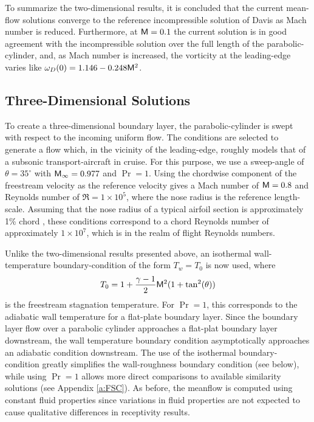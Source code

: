 To summarize the two-dimensional results, it is concluded that the current
mean-flow solutions converge to the reference incompressible solution of Davis
as Mach number is reduced.  Furthermore, at ${\sf M}=0.1$ the current solution is
in good agreement with the incompressible solution over the full length of the
parabolic-cylinder, and, as Mach number is increased, the vorticity at the
leading-edge varies like $\omega_D(0) = 1.146 - 0.248 {\sf M}^{2}$.

\subsection{Three-Dimensional Solutions \label{ss:3Dmean} }

To create a three-dimensional boundary layer, the parabolic-cylinder is swept
with respect to the incoming uniform flow.  The conditions are selected to
generate a flow which, in the vicinity of the leading-edge, roughly models
that of a subsonic transport-aircraft in cruise.  For this purpose, we use a
sweep-angle of $\theta = 35^\circ$ with ${\sf M}_\infty = 0.977$ and $\Pr = 1$.
Using the chordwise component of the freestream velocity as the reference
velocity gives a Mach number of ${\sf M} = 0.8$ and Reynolds number of $\Re =
1\times 10^5$, where the nose radius is the reference length-scale.  Assuming
that the nose radius of a typical airfoil section is approximately 1\% chord
\cite{AbDo:59}, these conditions correspond to a chord Reynolds number of
approximately $1\times 10^7$, which is in the realm of flight Reynolds
numbers.

Unlike the two-dimensional results presented above, an isothermal
wall-temp\-er\-ature boundary-condition of the form $T_w = T_0$ is now used,
where
%
\begin{equation}
  T_0 = 1 + \frac{\gamma-1}{2} {\sf M}^2 ( 1 + \tan^2(\theta) ) 
\end{equation}
%
is the freestream stagnation temperature.  For $\Pr = 1$, this corresponds to
the adiabatic wall temperature for a flat-plate boundary layer.  Since the
boundary layer flow over a parabolic cylinder approaches a flat-plat boundary
layer downstream, the wall temperature boundary condition asymptotically
approaches an adiabatic condition downstream.  The use of the isothermal
boundary-condition greatly simplifies the wall-roughness boundary condition
(see below), while using $\Pr=1$ allows more direct comparisons to available
similarity solutions (see Appendix \ref{a:FSC}).  As before, the meanflow
is computed using constant fluid properties since variations in fluid
properties are not expected to cause qualitative differences in receptivity
results.
%
%

